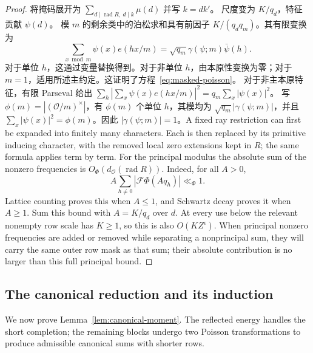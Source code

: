 \documentclass[11pt,a4paper]{article}
\numberwithin{equation}{section}
\numberwithin{figure}{section}
\theoremstyle{definition}
\theoremstyle{remark}
\begin{document}
\begin{proof}
将掩码展开为
\(\sum_{d\mid\operatorname{rad}R,\ d\mid k}\mu(d)\) 并写 \(k=dk'\)。
尺度变为 \(K/q_d\)，特征贡献 \(\psi(d)\)。
模 \(m\) 的剩余类中的泊松求和具有前因子
\(K/(q_dq_m)\)。其有限变换为
\[
 \sum_{x\bmod m}\psi(x)e(hx/m)
   =\sqrt{q_m}\gamma(\psi;m)\bar\psi(h).
\]
对于单位 \(h\)，这通过变量替换得到。对于非单位 \(h\)，由本原性变换为零；对于 \(m=1\)，适用所述主约定。这证明了方程~\eqref{eq:masked-poisson}。
对于非主本原特征，有限 Parseval 给出
\(\sum_h|\sum_x\psi(x)e(hx/m)|^2=q_m\sum_x|\psi(x)|^2\)。
写 \(\phi(m)=|(\mathcal O/m)^\times|\)，有 \(\phi(m)\) 个单位 \(h\)，其模均为
\(\sqrt{q_m}|\gamma(\psi;m)|\)，并且
\(\sum_x|\psi(x)|^2=\phi(m)\)。因此 \(|\gamma(\psi;m)|=1\)。A fixed ray restriction can first be expanded into finitely many
characters.  Each is then replaced by its primitive inducing character,
with the removed local zero extensions kept in \(R\); the same formula
applies term by term.  For the principal modulus the absolute sum of
the nonzero frequencies is \(O_\Phi(d_{\mathcal O}(\operatorname{rad}R))\).
Indeed, for all \(A>0\),
\[
 A\sum_{h\ne0}|\mathcal F\Phi(Aq_h)|\ll_\Phi1.
\]
Lattice counting proves this when \(A\le1\), and Schwartz decay proves
it when \(A\ge1\).  Sum this bound with \(A=K/q_d\) over \(d\).
At every use below the relevant nonempty row scale has \(K\ge1\), so
this is also \(O(KZ^\epsilon)\).  When principal nonzero frequencies
are added or removed while separating a nonprincipal sum, they will
carry the same outer row mask as that sum; their absolute contribution
is no larger than this full principal bound.
\end{proof}

\subsection{The canonical reduction and its induction}

We now prove Lemma~\ref{lem:canonical-moment}.  The reflected energy
handles the short completion; the remaining blocks undergo two Poisson
transformations to produce admissible canonical sums with shorter rows.
\end{document}
